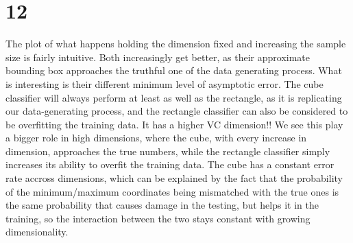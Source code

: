 \documentclass[a4paper,12pt]{article}
\begin{document}
\section*{12}
The plot of what happens holding the dimension fixed and increasing the sample size is fairly intuitive. Both increasingly get better, as their approximate bounding box approaches the truthful one of the data generating process. What is interesting is their different minimum level of asymptotic error. The cube classifier will always perform at least as well as the rectangle, as it is replicating our data-generating process, and the rectangle classifier can also be considered to be overfitting the training data. It has a higher VC dimension!! We see this play a bigger role in high dimensions, where the cube, with every increase in dimension, approaches the true numbers, while the rectangle classifier simply increases its ability to overfit the training data. The cube has a constant error rate accross dimensions, which can be explained by the fact that the probability of the minimum/maximum coordinates being mismatched with the true ones is the same probability that causes damage in the testing, but helps it in the training, so the interaction between the two stays constant with growing dimensionality.
\end{document}
